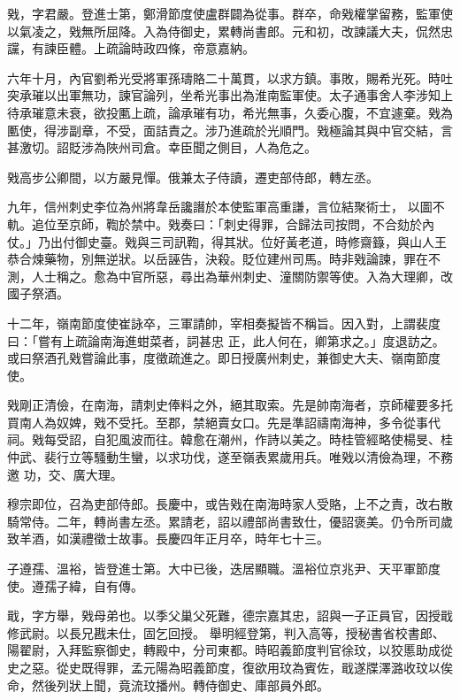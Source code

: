 \begin{pinyinscope}
 戣，字君嚴。登進士第，鄭滑節度使盧群闢為從事。群卒，命戣權掌留務，監軍使以氣凌之，戣無所屈降。入為侍御史，累轉尚書郎。元和初，改諫議大夫，侃然忠讜，有諫臣體。上疏論時政四條，帝意嘉納。



 六年十月，內官劉希光受將軍孫璹賂二十萬貫，以求方鎮。事敗，賜希光死。時吐
 突承璀以出軍無功，諫官論列，坐希光事出為淮南監軍使。太子通事舍人李涉知上待承璀意未衰，欲投匭上疏，論承璀有功，希光無事，久委心腹，不宜遽棄。戣為匭使，得涉副章，不受，面詰責之。涉乃進疏於光順門。戣極論其與中官交結，言甚激切。詔貶涉為陜州司倉。幸臣聞之側目，人為危之。



 戣高步公卿間，以方嚴見憚。俄兼太子侍讀，遷吏部侍郎，轉左丞。



 九年，信州刺史李位為州將韋岳讒譖於本使監軍高重謙，言位結聚術士，
 以圖不軌。追位至京師，鞫於禁中。戣奏曰：「刺史得罪，合歸法司按問，不合劾於內仗。」乃出付御史臺。戣與三司訊鞫，得其狀。位好黃老道，時修齋籙，與山人王恭合煉藥物，別無逆狀。以岳誣告，決殺。貶位建州司馬。時非戣論諫，罪在不測，人士稱之。愈為中官所惡，尋出為華州刺史、潼關防禦等使。入為大理卿，改國子祭酒。



 十二年，嶺南節度使崔詠卒，三軍請帥，宰相奏擬皆不稱旨。因入對，上謂裴度曰：「嘗有上疏論南海進蚶菜者，詞甚忠
 正，此人何在，卿第求之。」度退訪之。或曰祭酒孔戣嘗論此事，度徵疏進之。即日授廣州刺史，兼御史大夫、嶺南節度使。



 戣剛正清儉，在南海，請刺史俸料之外，絕其取索。先是帥南海者，京師權要多托買南人為奴婢，戣不受托。至郡，禁絕賣女口。先是準詔禱南海神，多令從事代祠。戣每受詔，自犯風波而往。韓愈在潮州，作詩以美之。時桂管經略使楊旻、桂仲武、裴行立等騷動生蠻，以求功伐，遂至嶺表累歲用兵。唯戣以清儉為理，不務邀
 功，交、廣大理。



 穆宗即位，召為吏部侍郎。長慶中，或告戣在南海時家人受賂，上不之責，改右散騎常侍。二年，轉尚書左丞。累請老，詔以禮部尚書致仕，優詔褒美。仍令所司歲致羊酒，如漢禮徵士故事。長慶四年正月卒，時年七十三。



 子遵孺、溫裕，皆登進士第。大中已後，迭居顯職。溫裕位京兆尹、天平軍節度使。遵孺子緯，自有傳。



 戢，字方舉，戣母弟也。以季父巢父死難，德宗嘉其忠，詔與一子正員官，因授戢修武尉。以長兄戡未仕，固乞回授。
 舉明經登第，判入高等，授秘書省校書郎、陽翟尉，入拜監察御史，轉殿中，分司東都。時昭義節度判官徐玟，以狡慝助成從史之惡。從史既得罪，孟元陽為昭義節度，復欲用玟為賓佐，戢遂牒澤潞收玟以俟命，然後列狀上聞，竟流玟播州。轉侍御史、庫部員外郎。




\end{pinyinscope}
